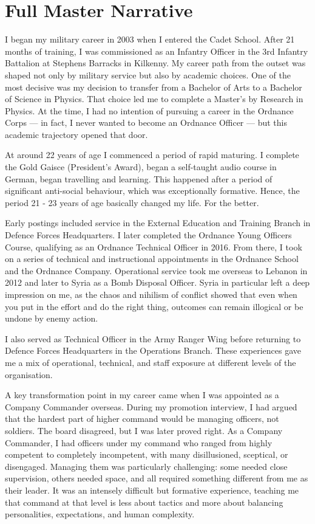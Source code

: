 \chapter{Full Master Narrative}


I began my military career in 2003 when I entered the Cadet School. After 21 months of training, I was commissioned as an Infantry Officer in the 3rd Infantry Battalion at Stephens Barracks in Kilkenny. My career path from the outset was shaped not only by military service but also by academic choices. One of the most decisive was my decision to transfer from a Bachelor of Arts to a Bachelor of Science in Physics. That choice led me to complete a Master’s by Research in Physics. At the time, I had no intention of pursuing a career in the Ordnance Corps --- in fact, I never wanted to become an Ordnance Officer --- but this academic trajectory opened that door.

At around 22 years of age I commenced a period of rapid maturing. I complete the Gold Gaisce (President's Award), began a self-taught audio course in German, began travelling and learning. This happened after a period of significant anti-social behaviour, which was exceptionally formative. Hence, the period 21 - 23 years of age basically changed my life. For the better.

Early postings included service in the External Education and Training Branch in Defence Forces Headquarters. I later completed the Ordnance Young Officers Course, qualifying as an Ordnance Technical Officer in 2016. From there, I took on a series of technical and instructional appointments in the Ordnance School and the Ordnance Company. Operational service took me overseas to Lebanon in 2012 and later to Syria as a Bomb Disposal Officer. Syria in particular left a deep impression on me, as the chaos and nihilism of conflict showed that even when you put in the effort and do the right thing, outcomes can remain illogical or be undone by enemy action.

I also served as Technical Officer in the Army Ranger Wing before returning to Defence Forces Headquarters in the Operations Branch. These experiences gave me a mix of operational, technical, and staff exposure at different levels of the organisation.

A key transformation point in my career came when I was appointed as a Company Commander overseas. During my promotion interview, I had argued that the hardest part of higher command would be managing officers, not soldiers. The board disagreed, but I was later proved right. As a Company Commander, I had officers under my command who ranged from highly competent to completely incompetent, with many disillusioned, sceptical, or disengaged. Managing them was particularly challenging: some needed close supervision, others needed space, and all required something different from me as their leader. It was an intensely difficult but formative experience, teaching me that command at that level is less about tactics and more about balancing personalities, expectations, and human complexity.

